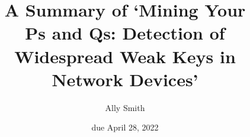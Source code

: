 \documentclass[12pt]{article}
\title{\bf A Summary of `Mining Your \\Ps and Qs: Detection of
Widespread Weak Keys in Network Devices'}
\author{Ally Smith}
\date{due April 28, 2022}
\begin{document}
\maketitle{}
\end{document}
